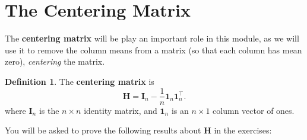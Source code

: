 \documentclass[
]{book}
\theoremstyle{definition}
\newtheorem{definition}{Definition}[chapter]
\theoremstyle{definition}
\theoremstyle{definition}
\theoremstyle{definition}
\theoremstyle{remark}
\begin{document}
\section{The Centering Matrix}\label{centering-matrix}

The \textbf{centering matrix} will be play an important role in this module, as we will use it to remove the column means from a matrix (so that each column has mean zero), \emph{centering} the matrix.

\begin{definition}
\protect\hypertarget{def:centeringmatrix}{}\label{def:centeringmatrix}The \textbf{centering matrix} is
\begin{equation}
\mathbf H=\mathbf I_n - \frac{1}{n} {\mathbf 1}_n {\mathbf 1}_n^\top.
\label{eq:Hcentre}
\end{equation}
where \(\mathbf I_n\) is the \(n \times n\) identity matrix, and \({\mathbf 1}_n\) is an \(n \times 1\) column vector of ones.
\end{definition}

You will be asked to prove the following results about \(\mathbf H\) in the exercises:
\end{document}
